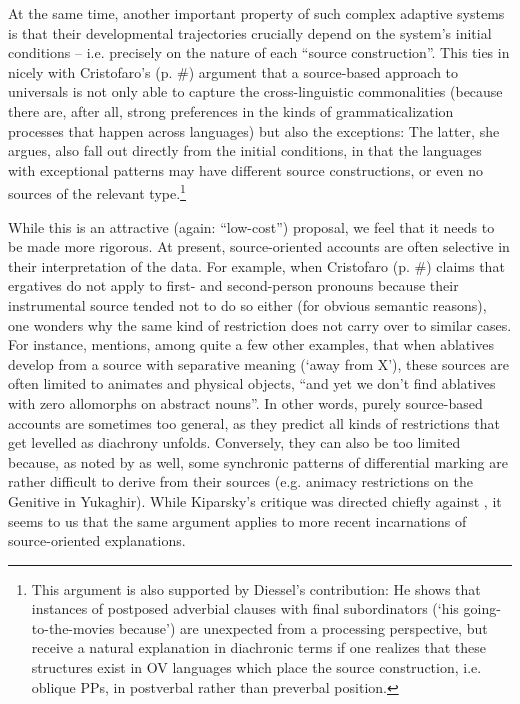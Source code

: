 \documentclass[output=paper]{langsci/langscibook}
\begin{document}
At the same time, another important property of such complex adaptive systems is that their developmental trajectories crucially depend on the system’s initial conditions – i.e. precisely on the nature of each “source construction”. This ties in nicely with Cristofaro’s (p. \#) argument that a source-based approach to universals is not only able to capture the cross-linguistic commonalities (because there are, after all, strong preferences in the kinds of grammaticalization processes that happen across languages) but also the exceptions: The latter, she argues, also fall out directly from the initial conditions, in that the languages with exceptional patterns may have different source constructions, or even no sources of the relevant type.\footnote{This argument is also supported by Diessel’s contribution: He shows that instances of postposed adverbial clauses with final subordinators (‘his going-to-the-movies because’) are unexpected from a processing perspective, but receive a natural explanation in diachronic terms if one realizes that these structures exist in OV languages which place the source construction, i.e. oblique PPs, in postverbal rather than preverbal position.}  

While this is an attractive (again: “low-cost”) proposal, we feel that it needs to be made more rigorous. At present, source-oriented accounts are often selective in their interpretation of the data. For example, when Cristofaro (p. \#) claims that ergatives do not apply to first- and second-person pronouns because their instrumental source tended not to do so either (for obvious semantic reasons), one wonders why the same kind of restriction does not carry over to similar cases. For instance, \citet[36]{Kiparsky2008} mentions, among quite a few other examples, that when ablatives develop from a source with separative meaning (‘away from X’), these sources are often limited to animates and physical objects, “and yet we don't find ablatives with zero allomorphs on abstract nouns”. In other words, purely source-based accounts are sometimes too general, as they predict all kinds of restrictions that get levelled as diachrony unfolds. Conversely, they can also be too limited because, as noted by \citet{Kiparsky2008} as well, some synchronic patterns of differential marking are rather difficult to derive from their sources (e.g. animacy restrictions on the Genitive in Yukaghir). While Kiparsky’s critique was directed chiefly against \citet{Garrett1990}, it seems to us that the same argument applies to more recent incarnations of source-oriented explanations.
\end{document}
